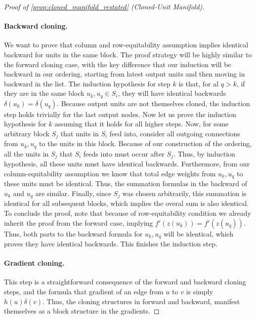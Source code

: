 \documentclass{article}
\numberwithin{figure}{section}
\begin{document}
\begin{proof}[Proof of \cref{prop:cloned_manifold_restated} (Cloned-Unit Manifold)]
\paragraph{‌Backward cloning.} We want to prove that column and row-equitability assumption implies identical backward for units in the same block. The  proof strategy will be highly similar to the forward cloning case, with the key difference that our induction will be backward in our ordering, starting from latest output units and then moving in backward in the list. The induction hypothesis for step $k$ is that, for al $q > k$, if they are in the same block $u_k,u_q\in S_i$, they will have identical backwards $\delta(u_k)=\delta(u_q).$ Because output units are not themselves cloned, the induction step holds trivially for the last output nodes. Now let us prove the induction hypothesis for $k$ assuming that it holds for all higher steps. Now, for some arbitrary block $S_j$ that units in $S_i$ feed into, consider all outgoing connections from $u_k,u_q$ to the units in this block. Because of our construction of the ordering, all the units in $S_j$ that $S_i$ feeds into must occur after $S_j.$ Thus, by induction hypothesis, all these units must have identical backwards. Furthermore, from our column-equitability assumption we know that total edge weights from $u_k,u_q$ to these units must be identical. Thus, the summation formulas in the backward of $u_k$ and $u_q$ are similar. Finally, since $S_j$ was chosen arbitrarily, this summation is identical for all subsequent blocks, which implies the overal sum is also identical. To conclude the proof, note that because of row-equitability condition we already inherit the proof from the forward case, implying  $f'(z(u_k)) = f'(z(u_q)). $ Thus, both parts to the backward formula for $u_k,u_q$ will be identical, which proves they have identical backwards. This finishes the induction step. 
\paragraph{Gradient cloning.} This step is a straightforward consequence of the forward and backward cloning steps, and the formula that gradient of an edge from $u$ to $v$ is simply $h(u)\delta(v).$ Thus, the cloning structures in forward and backward, manifest themselves as a block structure in the gradients. 

\end{proof}
\end{document}

